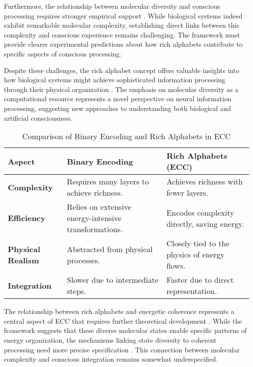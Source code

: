 Furthermore, the relationship between molecular diversity and conscious processing requires stronger empirical support \cite{noe2009out}. While biological systems indeed exhibit remarkable molecular complexity, establishing direct links between this complexity and conscious experience remains challenging. The framework must provide clearer experimental predictions about how rich alphabets contribute to specific aspects of conscious processing.

Despite these challenges, the rich alphabet concept offers valuable insights into how biological systems might achieve sophisticated information processing through their physical organization \cite{chalmers2010character}. The emphasis on molecular diversity as a computational resource represents a novel perspective on neural information processing, suggesting new approaches to understanding both biological and artificial consciousness.

\begin{table}[h!]
\centering
\begin{tabularx}{\textwidth}{@{}lXl@{}}
\toprule
\textbf{Aspect}            & \textbf{Binary Encoding}                  & \textbf{Rich Alphabets (ECC)}         \\ \midrule
\textbf{Complexity}        & Requires many layers to achieve richness. & Achieves richness with fewer layers.  \\
\textbf{Efficiency}        & Relies on extensive energy-intensive transformations. & Encodes complexity directly, saving energy. \\
\textbf{Physical Realism}  & Abstracted from physical processes.       & Closely tied to the physics of energy flows. \\
\textbf{Integration}       & Slower due to intermediate steps.         & Faster due to direct representation.  \\ \bottomrule
\end{tabularx}
\caption{Comparison of Binary Encoding and Rich Alphabets in ECC}
\label{tab:binary_vs_rich}
\end{table}

The relationship between rich alphabets and energetic coherence represents a central aspect of ECC that requires further theoretical development \cite{deacon2011incomplete}. While the framework suggests that these diverse molecular states enable specific patterns of energy organization, the mechanisms linking state diversity to coherent processing need more precise specification \cite{koch2019feeling}. This connection between molecular complexity and conscious integration remains somewhat underspecified.

